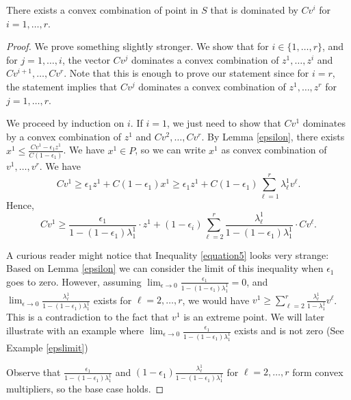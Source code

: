 \begin{lemma}\label{tightcutcomb}
	There exists a convex combination of point in $S$ that is dominated by $Cv^i$ for $i=1,\ldots,r$.
\end{lemma}
\begin{proof}
	
	
	We prove something slightly stronger. We show that for $i\in\{1,\ldots,r\}$, and for $j=1,\ldots,i$, the vector $Cv^j$ dominates  a convex combination of $z^1,\ldots,z^i$ and $Cv^{i+1},\ldots,Cv^r$. Note that this is enough to prove our statement since for $i=r$, the statement implies that $Cv^j$ dominates a convex combination of $z^1,\ldots,z^r$ for $j=1,\ldots,r$. 
	
	We proceed by induction on $i$. If $i=1$, we just need to show that $Cv^1$ dominates by a convex combination of $z^1$ and $Cv^2,\ldots,Cv^r$. By Lemma \ref{epsilon}, there exists $x^1\leq  \frac{Cv^1-\epsilon_1z^1}{C(1-\epsilon_1)}$. We have $x^1\in P$, so we can write $x^1$ as convex combination of $v^1,\ldots, v^r$. We have
	\begin{equation}\label{equation5}
	Cv^1 \geq  \epsilon_1z^1 + C(1-\epsilon_1)x^1 \geq \epsilon_1z^1 + C(1-\epsilon_1) \sum_{\ell=1}^{r}\lambda^1_\ell v^\ell.
	\end{equation}
	Hence,
	\begin{equation}\label{equation6}
	Cv^1 \geq \frac{\epsilon_1}{1-(1-\epsilon_1)\lambda^1_1}\cdot z^1 + (1-\epsilon_i)\sum_{\ell=2}^{r} \frac{\lambda^1_\ell}{1-(1-\epsilon_1)\lambda_1^1}\cdot Cv^\ell.
	\end{equation}
	
	A curious reader might notice that Inequality \ref{equation5} looks very strange: Based on Lemma \ref{epsilon} we can consider the limit of this inequality when $\epsilon_1$ goes to zero. However, assuming $\lim_{\epsilon\rightarrow 0}\frac{\epsilon_1}{1-(1-\epsilon_1)\lambda^1_1}=0$, and 
	$\lim_{\epsilon\rightarrow 0}\frac{\lambda^1_\ell}{1-(1-\epsilon_1)\lambda_1^1}$ exists for $\ell=2,\ldots,r$, we would have $v^1\geq \sum_{\ell=2}^{r} \frac{\lambda^1_\ell}{1-\lambda_1^1}v^\ell$. This is a contradiction to the fact that $v^1$ is an extreme point. We will later illustrate with an example where $\lim_{\epsilon\rightarrow 0}\frac{\epsilon_1}{1-(1-\epsilon_1)\lambda^1_1}$ exists and is not zero (See Example \ref{epslimit})
	
	Observe that $\frac{\epsilon_1}{1-(1-\epsilon_1)\lambda^1_1}$ and $(1-\epsilon_1)\frac{\lambda^1_\ell}{1-(1-\epsilon_1)\lambda_1^1}$ for $\ell=2,\ldots,r$ form convex multipliers, so the base case holds.
	

\end{proof}

